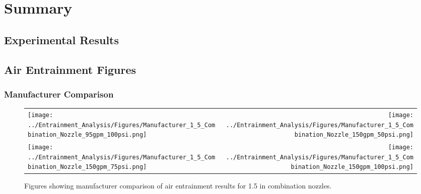 \documentclass{article}
\begin{document}
\section{Summary}



\printbibliography

\clearpage

\begin{appendices}

\section{Experimental Results} \label{App:Results}
\renewcommand{\thesubsection}{\Alph{section}}

\appendix


\subsection{Air Entrainment Figures}
\label{app:Air_Entrainment_Figures}

\subsubsection{Manufacturer Comparison}

\begin{figure}[!ht]
\begin{tabular*}{\textwidth}{lr}
\texttt{[image: ../Entrainment\_Analysis/Figures/Manufacturer\_1\_5\_Combination\_Nozzle\_95gpm\_100psi.png]} &
\texttt{[image: ../Entrainment\_Analysis/Figures/Manufacturer\_1\_5\_Combination\_Nozzle\_150gpm\_50psi.png]} \\
\texttt{[image: ../Entrainment\_Analysis/Figures/Manufacturer\_1\_5\_Combination\_Nozzle\_150gpm\_75psi.png]} &
\texttt{[image: ../Entrainment\_Analysis/Figures/Manufacturer\_1\_5\_Combination\_Nozzle\_150gpm\_100psi.png]} \\
\end{tabular*}
\caption{Figures showing manufacturer comparison of air entrainment results for 1.5 in combination nozzles.}
\label{fig:1_5_Interior_Combination_Manufacturer}
\end{figure}

\clearpage


\end{appendices}
\end{document}
